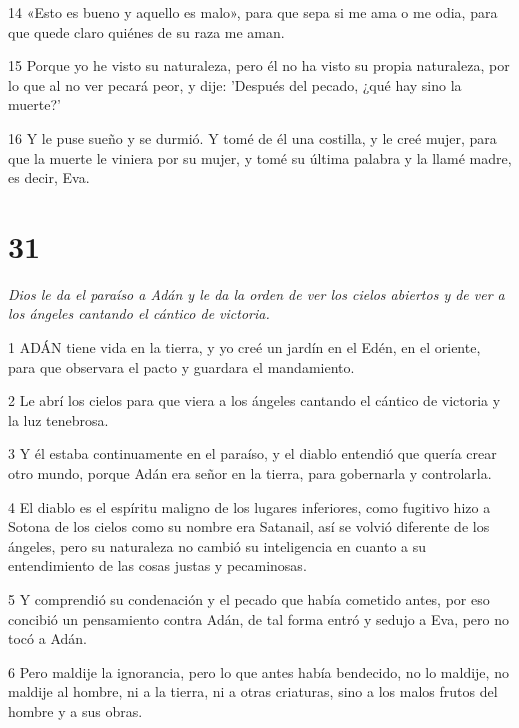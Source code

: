 \par 14 «Esto es bueno y aquello es malo», para que sepa si me ama o me odia, para que quede claro quiénes de su raza me aman.

\par 15 Porque yo he visto su naturaleza, pero él no ha visto su propia naturaleza, por lo que al no ver pecará peor, y dije: 'Después del pecado, ¿qué hay sino la muerte?'

\par 16 Y le puse sueño y se durmió. Y tomé de él una costilla, y le creé mujer, para que la muerte le viniera por su mujer, y tomé su última palabra y la llamé madre, es decir, Eva.

\chapter{31}

\par \textit{Dios le da el paraíso a Adán y le da la orden de ver los cielos abiertos y de ver a los ángeles cantando el cántico de victoria.}

\par 1 ADÁN tiene vida en la tierra, y yo creé un jardín en el Edén, en el oriente, para que observara el pacto y guardara el mandamiento.

\par 2 Le abrí los cielos para que viera a los ángeles cantando el cántico de victoria y la luz tenebrosa.

\par 3 Y él estaba continuamente en el paraíso, y el diablo entendió que quería crear otro mundo, porque Adán era señor en la tierra, para gobernarla y controlarla.

\par 4 El diablo es el espíritu maligno de los lugares inferiores, como fugitivo hizo a Sotona de los cielos como su nombre era Satanail, así se volvió diferente de los ángeles, pero su naturaleza no cambió su inteligencia en cuanto a su entendimiento de las cosas justas y pecaminosas.

\par 5 Y comprendió su condenación y el pecado que había cometido antes, por eso concibió un pensamiento contra Adán, de tal forma entró y sedujo a Eva, pero no tocó a Adán.

\par 6 Pero maldije la ignorancia, pero lo que antes había bendecido, no lo maldije, no maldije al hombre, ni a la tierra, ni a otras criaturas, sino a los malos frutos del hombre y a sus obras.

